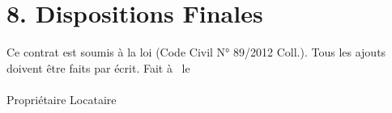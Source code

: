 \section*{8. Dispositions Finales}
Ce contrat est soumis à la loi (Code Civil N° 89/2012 Coll.). Tous les ajouts doivent être faits par écrit. 
\vspace{2cm}
Fait à \ContractPlace \ le \ContractDate \hfill \underline{\hspace{5cm}} \\ \vspace{1.5cm}
\underline{\hspace{5cm}} \hfill \underline{\hspace{5cm}} \\ \vspace{0.2cm} Propriétaire \hfill Locataire \\
